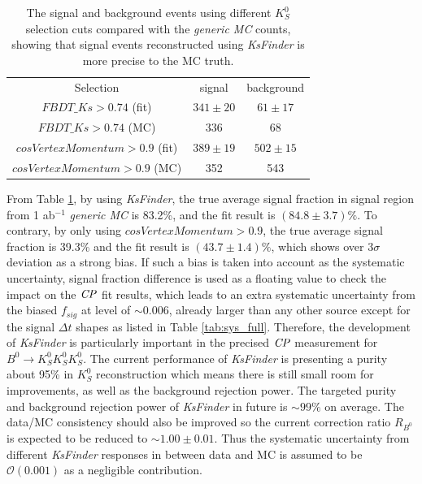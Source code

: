 \begin{table}[htpb]
	\centering
	\caption{The signal and background events using different $K_S^0$ selection cuts compared with the \textit{generic MC} counts, showing that signal events reconstructed using \textit{KsFinder} is more precise to the MC truth. }
	\label{tab:ksbias}
	\begin{tabular}{c| c |c}
		\hline
		Selection & signal  & background \\
		${FBDT\_Ks>0.74}$ (fit) & $341\pm20$ & $61\pm17$ \\
		${FBDT\_Ks>0.74}$ (MC) & 336 & 68\\
		${cosVertexMomentum>0.9}$ (fit) & $389\pm19$ & $502\pm15$\\
		${cosVertexMomentum>0.9}$ (MC) & 352 & 543\\
		\hline
	\end{tabular}
\end{table}

From Table \ref{tab:ksbias}, by using \textit{KsFinder}, the true average signal fraction in signal region from 1 ab$^{-1}$ \textit{generic MC} is 83.2\%, and the fit result is $(84.8\pm3.7)\%$. To contrary, by only using ${cosVertexMomentum>0.9}$, the true average signal fraction is 39.3\% and the fit result is $(43.7\pm1.4)\%$, which shows over $3\sigma$ deviation as a strong bias. If such a bias is taken into account as the systematic uncertainty, signal fraction difference is used as a floating value to check the impact on the $\it{CP}$ fit results, which leads to an extra systematic uncertainty from the biased $f_{sig}$ at level of $\sim 0.006$, already larger than any other source except for the signal $\Delta t$ shapes as listed in Table \ref{tab:sys_full}. Therefore, the development of \textit{KsFinder} is particularly important in the precised $\it{CP}$ measurement for $B^0 \to K_S^0  K_S^0  K_S^0$. The current performance of \textit{KsFinder} is presenting a purity about 95\% in $K_S^0$ reconstruction which means there is still small room for improvements, as well as the background rejection power. The targeted purity and background rejection power of \textit{KsFinder} in future is $\sim 99\%$ on average. The data/MC consistency should also be improved so the current correction ratio $R_{B^0}$ is expected to be reduced to $\sim 1.00\pm 0.01$. Thus the systematic uncertainty from different \textit{KsFinder} responses in between data and MC is assumed to be $\mathcal{O}(0.001)$ as a negligible contribution. 



